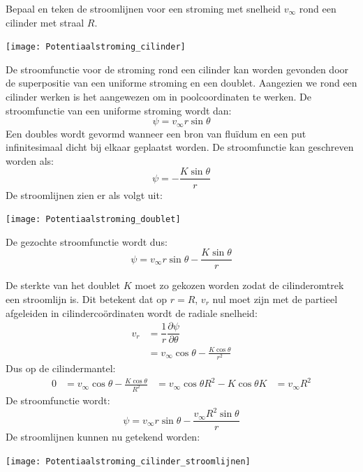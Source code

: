 \begin{voorbeeld}
	\label{Potentiaalstroming_cilinder}
	Bepaal en teken de stroomlijnen voor een stroming met snelheid $v_{\infty}$ rond een cilinder met straal $R$.
	\begin{center}
		\texttt{[image: Potentiaalstroming\_cilinder]}
	\end{center}
	
	De stroomfunctie voor de stroming rond een cilinder kan worden gevonden door de superpositie van een uniforme stroming en een doublet. Aangezien we rond een cilinder werken is het aangewezen om in poolcoordinaten te werken. De stroomfunctie van een uniforme stroming wordt dan:
	\begin{equation*}
		\psi = v_{\infty} r \sin{\theta}
	\end{equation*}
	Een doubles wordt gevormd wanneer een bron van fluïdum en een put infinitesimaal dicht bij elkaar geplaatst worden. De stroomfunctie kan geschreven worden als:
	 \begin{equation*}
		\psi = -\frac{K \sin \theta}{r}
	\end{equation*}
	De stroomlijnen zien er als volgt uit:
	\begin{center}
		\texttt{[image: Potentiaalstroming\_doublet]}
	\end{center}
	De gezochte stroomfunctie wordt dus:
	\begin{equation*}
		\psi = v_{\infty} r \sin{\theta} - \frac{K \sin \theta}{r}
	\end{equation*}

	De sterkte van het doublet $K$ moet zo gekozen worden zodat de cilinderomtrek een stroomlijn is. Dit betekent dat op $r=R$, $v_r$ nul moet zijn met de partieel afgeleiden in cilindercoördinaten wordt de radiale snelheid:
	\begin{align*}
		v_{r} &= \dfrac{1}{r}\dfrac{\partial \psi}{\partial \theta} \\
		      &= v_{\infty} \cos{\theta} - \frac{K \cos \theta}{r^2}
	\end{align*}
	Dus op de cilindermantel:
	\begin{align*}
		0 &= v_{\infty} \cos{\theta} - \frac{K \cos \theta}{R^2}
		  &= v_{\infty} \cos{\theta} R^2 - K \cos \theta
		K &= v_{\infty} R^2
	\end{align*}
	De stroomfunctie wordt:
	\begin{equation*}
		\psi = v_{\infty} r \sin{\theta} - \frac{v_{\infty} R^2 \sin \theta}{r}
	\end{equation*}
	De stroomlijnen kunnen nu getekend worden:
	\begin{center}
		\texttt{[image: Potentiaalstroming\_cilinder\_stroomlijnen]}
	\end{center}
	
\end{voorbeeld}


